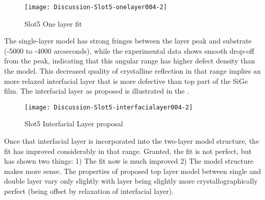 \begin{figure}[hc]%
\caption{Slot5 One layer fit}
\label{Slot5-One004}
\begin{minipage}{0.85\linewidth}
\texttt{[image: Discussion-Slot5-onelayer004-2]}
\end{minipage}
\end{figure}

The single-layer model has strong fringes between the layer peak and substrate (-5000 to -4000 arcseconds), while the experimental data shows smooth drop-off from the peak, indicating that this angular range has higher defect density than the model.   This decreased quality of crystalline reflection in that range  implies an more relaxed interfacial layer that is more defective than top part of the SiGe film.  The interfacial layer as proposed is illustrated in the .

\begin{figure}[hc]%
\caption{Slot5 Interfacial Layer proposal}
\label{Slot5-Interfacial004}
\begin{minipage}{0.85\linewidth}
\texttt{[image: Discussion-Slot5-interfacialayer004-2]}
\end{minipage}
\end{figure}
 
Once that interfacial layer is incorporated into the two-layer model structure, the fit has improved considerably in that range.  Granted, the fit is not perfect, but has shown two things:  1) The fit now is much improved 2) The model structure makes more sense.  The properties of proposed top layer model between single and double layer vary only slightly with layer being slightly more crystallographically perfect (being offset by relaxation of interfacial layer).

